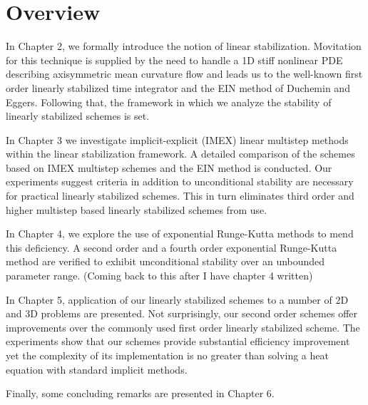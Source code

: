 \section{Overview}
In Chapter 2, we formally introduce the notion of linear stabilization. Movitation for this technique is supplied by the need to handle a 1D stiff nonlinear PDE describing axisymmetric mean curvature flow and leads us to the well-known first order linearly stabilized time integrator and the EIN method of Duchemin and Eggers. Following that, the framework in which we analyze the stability of linearly stabilized schemes is set. 

In Chapter 3 we investigate implicit-explicit (IMEX) linear multistep methods within the linear stabilization framework. A detailed comparison of the schemes based on IMEX multistep schemes and the EIN method is conducted. Our experiments suggest criteria in addition to unconditional stability are necessary for practical linearly stabilized schemes. This in turn eliminates third order and higher multistep based linearly stabilized schemes from use. 

In Chapter 4, we explore the use of exponential Runge-Kutta methods to mend this deficiency. A second order and a fourth order exponential Runge-Kutta method are verified to exhibit unconditional stability over an unbounded parameter range. (Coming back to this after I have chapter 4 written)

In Chapter 5, application of our linearly stabilized schemes to a number of 2D and 3D problems are presented. Not surprisingly, our second order schemes offer improvements over the commonly used first order linearly stabilized scheme. The experiments show that our schemes provide substantial efficiency improvement yet the complexity of its implementation is no greater than solving a heat equation with standard implicit methods.

Finally, some concluding remarks are presented in Chapter 6.  
 